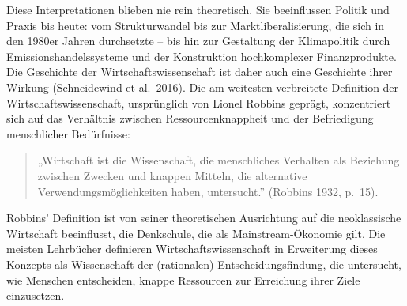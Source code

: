 \documentclass[
  nswissgerman,
  a4paper,
  openany]{book}
\begin{document}
Diese Interpretationen blieben nie rein theoretisch. Sie beeinflussen
Politik und Praxis bis heute: vom Strukturwandel bis zur
Marktliberalisierung, die sich in den 1980er Jahren durchsetzte -- bis
hin zur Gestaltung der Klimapolitik durch Emissionshandelssysteme und
der Konstruktion hochkomplexer Finanzprodukte. Die Geschichte der
Wirtschaftswissenschaft ist daher auch eine Geschichte ihrer Wirkung
(Schneidewind et al.~2016). Die am weitesten verbreitete Definition der
Wirtschaftswissenschaft, ursprünglich von Lionel Robbins geprägt,
konzentriert sich auf das Verhältnis zwischen Ressourcenknappheit und
der Befriedigung menschlicher Bedürfnisse:

\begin{quote}
„Wirtschaft ist die Wissenschaft, die menschliches Verhalten als
Beziehung zwischen Zwecken und knappen Mitteln, die alternative
Verwendungsmöglichkeiten haben, untersucht.'' (Robbins 1932, p.~15).
\end{quote}

Robbins' Definition ist von seiner theoretischen Ausrichtung auf die
neoklassische Wirtschaft beeinflusst, die Denkschule, die als
Mainstream-Ökonomie gilt. Die meisten Lehrbücher definieren
Wirtschaftswissenschaft in Erweiterung dieses Konzepts als Wissenschaft
der (rationalen) Entscheidungsfindung, die untersucht, wie Menschen
entscheiden, knappe Ressourcen zur Erreichung ihrer Ziele einzusetzen.
\end{document}
